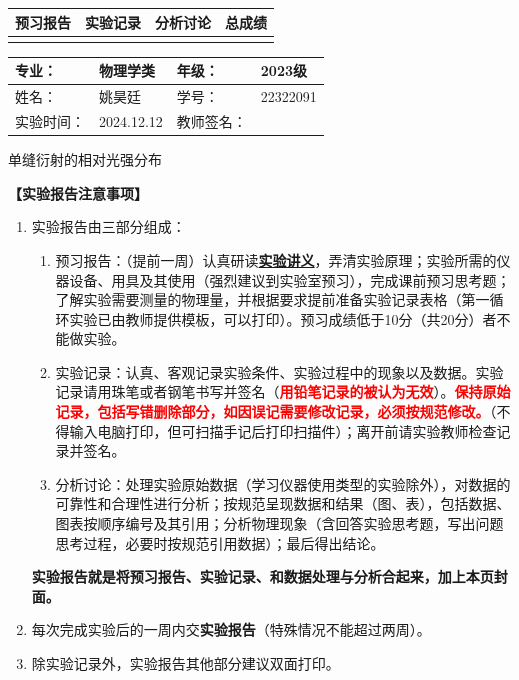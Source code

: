\documentclass[dvipsnames, svgnames,a4paper,11pt]{article}
\begin{document}
\begin{table}
	\renewcommand\arraystretch{1.7}
	\begin{tabularx}{\textwidth}{
		|X|X|X|X
		|X|X|X|X|}
	\hline
	\multicolumn{2}{|c|}{预习报告}&\multicolumn{2}{|c|}{实验记录}&\multicolumn{2}{|c|}{分析讨论}&\multicolumn{2}{|c|}{总成绩}\\
	\hline
	 & &  & &  & &  & \\
	\hline
	\end{tabularx}
\end{table}


\begin{table}
	\renewcommand\arraystretch{1.7}
	\begin{tabularx}{\textwidth}{|X|X|X|X|}
	\hline
	专业：& 物理学类 &年级：& 2023级\\
	\hline
	姓名：& 姚昊廷  & 学号：&22322091\\
	\hline
	实验时间：& 2024.12.12& 教师签名：& \\
	\hline
	\end{tabularx}
\end{table}

\begin{center}
	\LARGE 单缝衍射的相对光强分布
\end{center}

\textbf{【实验报告注意事项】}
\begin{enumerate}
	\item 实验报告由三部分组成：
	\begin{enumerate}
		\item 预习报告：（提前一周）认真研读\underline{\textbf{实验讲义}}，弄清实验原理；实验所需的仪器设备、用具及其使用（强烈建议到实验室预习），完成课前预习思考题；了解实验需要测量的物理量，并根据要求提前准备实验记录表格（第一循环实验已由教师提供模板，可以打印）。预习成绩低于10分（共20分）者不能做实验。
	    \item 实验记录：认真、客观记录实验条件、实验过程中的现象以及数据。实验记录请用珠笔或者钢笔书写并签名（\textcolor{red}{\textbf{用铅笔记录的被认为无效}}）。\textcolor{red}{\textbf{保持原始记录，包括写错删除部分，如因误记需要修改记录，必须按规范修改。}}（不得输入电脑打印，但可扫描手记后打印扫描件）；离开前请实验教师检查记录并签名。
	    \item 分析讨论：处理实验原始数据（学习仪器使用类型的实验除外），对数据的可靠性和合理性进行分析；按规范呈现数据和结果（图、表），包括数据、图表按顺序编号及其引用；分析物理现象（含回答实验思考题，写出问题思考过程，必要时按规范引用数据）；最后得出结论。
	\end{enumerate}
	\textbf{实验报告就是将预习报告、实验记录、和数据处理与分析合起来，加上本页封面。}
	\item 每次完成实验后的一周内交\textbf{实验报告}（特殊情况不能超过两周）。
	\item 除实验记录外，实验报告其他部分建议双面打印。
\end{enumerate}
\end{document}
